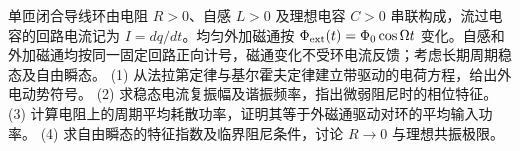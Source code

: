 单匝闭合导线环由电阻 \(R>0\)、自感 \(L>0\) 及理想电容 \(C>0\) 串联构成，流过电容的回路电流记为 \(I=dq/dt\)。均匀外加磁通按 \(\Phi_{\rm ext}(t)=\Phi_0\cos\Omega t\) 变化。自感和外加磁通均按同一固定回路正向计号，磁通变化不受环电流反馈；考虑长期周期稳态及自由瞬态。
(1) 从法拉第定律与基尔霍夫定律建立带驱动的电荷方程，给出外电动势符号。
(2) 求稳态电流复振幅及谐振频率，指出微弱阻尼时的相位特征。
(3) 计算电阻上的周期平均耗散功率，证明其等于外磁通驱动对环的平均输入功率。
(4) 求自由瞬态的特征指数及临界阻尼条件，讨论 \(R\to0\) 与理想共振极限。
